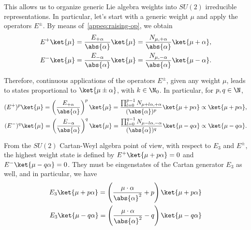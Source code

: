 This allows us to organize generic Lie algebra weights into $SU(2)$ irreducible representations. In particular, let's start with a generic weight $\mu$ and apply the operators $E^{\pm}$. By means of~\eqref{appeq:raising-op}, we obtain
\begin{subequations}
\begin{align}
    E^+ \ket{\mu} = \frac{E_{+\alpha}}{\abs{\alpha}} \ket{\mu} = \frac{N_{\mu, +\alpha}}{\abs{\alpha}} \ket{\mu + \alpha} ,\\
    E^- \ket{\mu} = \frac{E_{-\alpha}}{\abs{\alpha}} \ket{\mu} = \frac{N_{\mu, -\alpha}}{\abs{\alpha}} \ket{\mu - \alpha} .\\
\end{align}
\end{subequations}

Therefore, continuous applications of the operators $E^\pm$, given any weight $\mu$, leads to states proportional to $\ket{\mu \pm \alpha}$, with $k \in \N_0$. In particular, for $p,q \in \N$,
\begin{subequations}
    \begin{align}
        (E^+)^p \ket{\mu} = \left(\frac{E_{+\alpha}}{\abs{\alpha}}\right)^p \ket{\mu} = \frac{\prod_{l=0}^{p-1} N_{\mu + l\alpha, +\alpha}}{(\abs{\alpha})^p} \ket{\mu + p \alpha} \propto \ket{\mu + p \alpha},\\
        (E^-)^q \ket{\mu} = \left(\frac{E_{-\alpha}}{\abs{\alpha}}\right)^q \ket{\mu} = \frac{\prod_{l=0}^{q-1} N_{\mu - l\alpha, -\alpha}}{(\abs{\alpha})^q} \ket{\mu - q \alpha} \propto \ket{\mu - q \alpha} .\\
    \end{align}
    \end{subequations}

From the $SU(2)$ Cartan-Weyl algebra point of view, with respect to $E_3$ and $E^\pm$, the highest weight state is defined by $E^+ \ket{\mu + p\alpha} = 0$ and $E^- \ket{\mu - q \alpha} = 0$. They must be eingenstates of the Cartan generator $E_3$ as well, and in particular, we have
\begin{subequations}
\begin{align}
    E_3 \ket{\mu + p \alpha} = \left( \frac{\mu \cdot \alpha}{\abs{\alpha}^2} + p \right) \ket{\mu + p \alpha} \\
    E_3 \ket{\mu - q \alpha} = \left( \frac{\mu \cdot \alpha}{\abs{\alpha}^2} - q \right) \ket{\mu - q \alpha} \\
\end{align}
\end{subequations}

